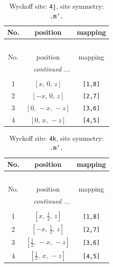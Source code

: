 \documentclass[fleqn,8pt]{jsarticle}
\begin{document}
\renewcommand{\arraystretch}{1.2}
\begin{longtable}{ccc}
\caption{Wyckoff site: {\tt 4j}, site symmetry: {\tt .m'.}}
 \\
 \hline \hline
No. & position & mapping \\ \hline \endfirsthead

\multicolumn{2}{l}{\tablename\ \thetable{}} \\
 \hline \hline
No. & position & mapping \\ \hline \endhead

 \hline \hline
\multicolumn{2}{r}{\footnotesize\it continued ...} \\ \endfoot

 \hline \hline
\multicolumn{2}{r}{} \\ \endlastfoot

1 & $\left[ x,\, 0,\, z \right]$ & {\tt [1,8]} \\ \hline
2 & $\left[ - x,\, 0,\, z \right]$ & {\tt [2,7]} \\ \hline
3 & $\left[ 0,\, - x,\, - z \right]$ & {\tt [3,6]} \\ \hline
4 & $\left[ 0,\, x,\, - z \right]$ & {\tt [4,5]} \\
\end{longtable}
\renewcommand{\arraystretch}{1.2}
\begin{longtable}{ccc}
\caption{Wyckoff site: {\tt 4k}, site symmetry: {\tt .m'.}}
 \\
 \hline \hline
No. & position & mapping \\ \hline \endfirsthead

\multicolumn{2}{l}{\tablename\ \thetable{}} \\
 \hline \hline
No. & position & mapping \\ \hline \endhead

 \hline \hline
\multicolumn{2}{r}{\footnotesize\it continued ...} \\ \endfoot

 \hline \hline
\multicolumn{2}{r}{} \\ \endlastfoot

1 & $\left[ x,\, \frac{1}{2},\, z \right]$ & {\tt [1,8]} \\ \hline
2 & $\left[ - x,\, \frac{1}{2},\, z \right]$ & {\tt [2,7]} \\ \hline
3 & $\left[ \frac{1}{2},\, - x,\, - z \right]$ & {\tt [3,6]} \\ \hline
4 & $\left[ \frac{1}{2},\, x,\, - z \right]$ & {\tt [4,5]} \\
\end{longtable}
\end{document}
